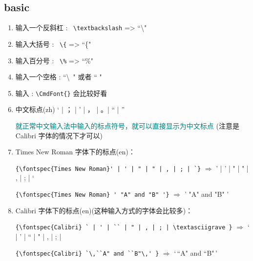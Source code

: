
\subsection{basic}

\begin{enumerate}[topsep=0pt,itemsep=0pt,parsep=0pt,leftmargin=3.6em,label=\arabic*>]
    \item 输入一个反斜杠 : {\color{red}\ \verb|\textbackslash|} => ``\textbackslash"
    \item 输入大括号 : {\color{red}\ \verb|\{|} => ``\{"
    \item 输入百分号 : {\color{red}\ \verb|\%|} => ``\%"
    \item 输入一个空格 : ``\textbackslash\ " 或者 ``{ }"
    \item 输入\CmdFont{--} : \verb!\CmdFont{!\CmdFont{--}\verb!}! 会比较好看
    \item 中文标点(zh) ‘ | ； | ’ | ， | 。| “ | ” \par
        \textcolor{teal}{就正常中文输入法中输入的标点符号，就可以直接显示为中文标点}
        {\color{red}(注意是 Calibri 字体的情况下才可以)}

    \item {\color{blue}Times New Roman 字体下的标点(en)}：\par
        \verb={\fontspec{Times New Roman}' | ' | " | " | , | ; | `}= 
        {\color{DefinedColorRed}$\Rightarrow$} %
        {' | ' | " | " | , | ; | `} \par
        \verb={\fontspec{Times New Roman} ' "A" and "B" '}=
        {\color{DefinedColorRed}$\Rightarrow$} %
        {' "A" and "B" '} \par
    \item {\color{blue}Calibri 字体下的标点(en)}{\color{red}(这种输入方式的字体会比较多)}：\par
        \verb={\fontspec{Calibri} ` | ' | `` | " | , | ; | \textasciigrave }=
        {\color{DefinedColorRed}$\Rightarrow$} %
        ` | ' | `` | " | , | ; | \textasciigrave \par
        \verb={\fontspec{Calibri} `\,``A" and ``B"\,' }=
        {\color{DefinedColorRed}$\Rightarrow$} %
        `\,``A" and ``B"\,'


\end{enumerate}
